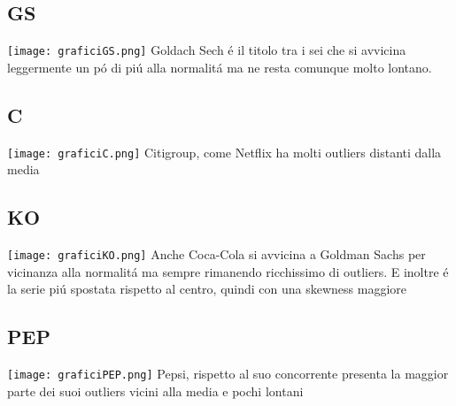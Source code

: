 \documentclass{report}
\begin{document}
\subsection{GS}
\texttt{[image: graficiGS.png]}
Goldach Sech é il titolo tra i sei che si avvicina leggermente un pó di piú alla normalitá ma ne resta comunque molto lontano.
\subsection{C}
\texttt{[image: graficiC.png]}
Citigroup, come Netflix ha molti outliers distanti dalla media
\subsection{KO}
\texttt{[image: graficiKO.png]}
Anche Coca-Cola si avvicina a Goldman Sachs per vicinanza alla normalitá ma sempre rimanendo ricchissimo di outliers. E inoltre é la serie piú spostata rispetto al centro, quindi con una skewness maggiore
\subsection{PEP}
\texttt{[image: graficiPEP.png]}
Pepsi, rispetto al suo concorrente presenta la maggior parte dei suoi outliers vicini alla media e pochi lontani
\end{document}
